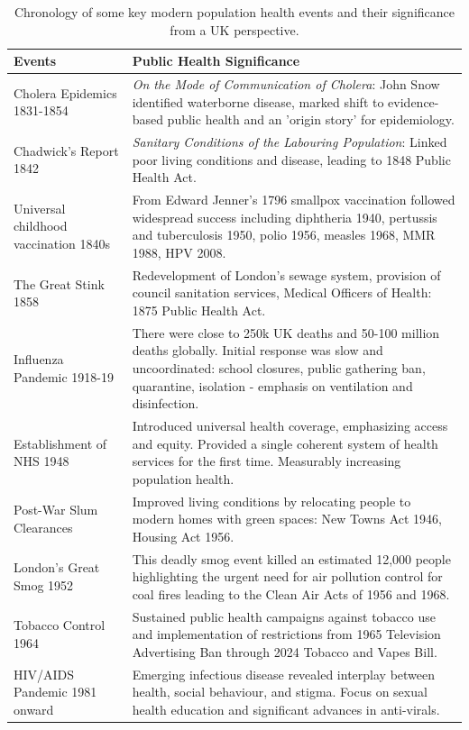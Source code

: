 \begin{table}[h]
	\centering
	\caption{Chronology of some key modern population health events and their significance from a UK perspective.}
	\begin{tabular}{@{}p{}p{}@{}}
		\toprule
		\textbf{Events} & \textbf{Public Health Significance} \\
		\midrule
		Cholera Epidemics 1831-1854 & \emph{On the Mode of Communication of Cholera}: John Snow identified waterborne disease, marked shift to evidence-based public health and an 'origin story' for epidemiology.
		\\
		Chadwick's Report 1842  & \emph{Sanitary Conditions of the Labouring Population}: Linked poor living conditions and disease, leading to 1848 Public Health Act.
		\\
		Universal childhood vaccination 1840s & From Edward Jenner's 1796 smallpox vaccination followed widespread success including diphtheria 1940, pertussis and tuberculosis 1950, polio 1956, measles 1968, MMR 1988, HPV 2008.
		\\
		The Great Stink 1858 & Redevelopment of London's sewage system, provision of council sanitation services, Medical Officers of Health: 1875 Public Health Act.
		\\
		Influenza Pandemic 1918-19 & There were close to 250k UK deaths and 50-100 million deaths globally. Initial response was slow and uncoordinated: school closures, public gathering ban, quarantine, isolation - emphasis on ventilation and disinfection.
		\\
		Establishment of NHS 1948 & Introduced universal health coverage, emphasizing access and equity. Provided a single coherent system of health services for the first time. Measurably increasing population health.
		\\
		Post-War Slum Clearances & Improved living conditions by relocating people to modern homes with green spaces: New Towns Act 1946, Housing Act 1956.
		\\
		London's Great Smog 1952 & This deadly smog event killed an estimated 12,000 people highlighting the urgent need for air pollution control for coal fires leading to the Clean Air Acts of 1956 and 1968.
		\\
		Tobacco Control 1964 &	Sustained public health campaigns against tobacco use and implementation of restrictions from 1965 Television Advertising Ban through 2024 Tobacco and Vapes Bill.
		\\
		HIV/AIDS Pandemic 1981 onward & Emerging infectious disease revealed interplay between health, social behaviour, and stigma. Focus on sexual health education and significant advances in anti-virals.

\end{tabular}
\end{table}
